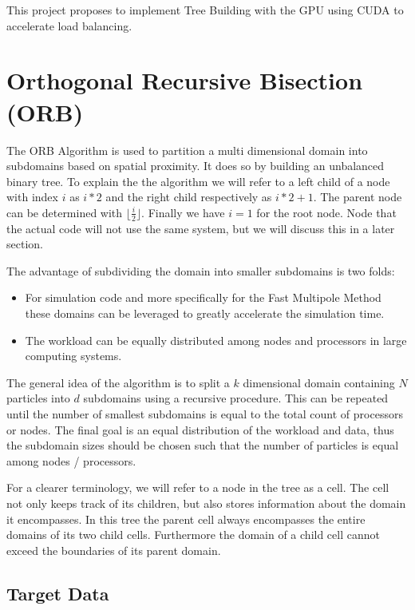\documentclass[]{article}
\begin{document}
This project proposes to implement Tree Building with the GPU using CUDA to accelerate load balancing.


\section{Orthogonal Recursive Bisection (ORB)}


The ORB Algorithm is used to partition a multi dimensional domain into subdomains based on spatial proximity. It does so by building an unbalanced binary tree. To explain the the algorithm we will refer to a left child of a node with index $i$ as $i*2$ and the right child respectively as $i*2 + 1$. The parent node can be determined with $\lfloor \frac{i}{2} \rfloor$. Finally we have $i = 1$ for the root node. Node that the actual code will not use the same system, but we will discuss this in a later section.

The advantage of subdividing the domain into smaller subdomains is two folds:

\begin{itemize}
	\item For simulation code and more specifically for the Fast Multipole Method these domains can be leveraged to greatly accelerate the simulation time. 
	\item The workload can be equally distributed among nodes and processors in large computing systems.
\end{itemize} 

The general idea of the algorithm is to split a $k$ dimensional domain containing $N$ particles into $d$ subdomains using a recursive procedure. This can be repeated until the number of smallest subdomains is equal to the total count of processors or nodes. The final goal is an equal distribution of the workload and data, thus the subdomain sizes should be chosen such that the number of particles is equal among nodes / processors.

For a clearer terminology, we will refer to a node in the tree as a cell. The cell not only keeps track of its children, but also stores information about the domain it encompasses. In this tree the parent cell always encompasses the entire domains of its two child cells. Furthermore the domain of a child cell cannot exceed the boundaries of its parent domain. 

\subsection{Target Data}
\end{document}
